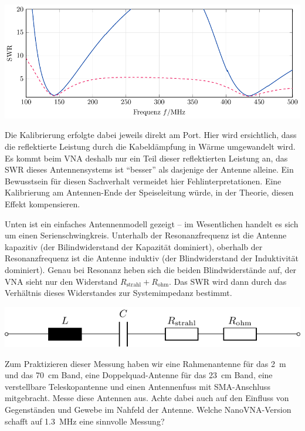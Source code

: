 \documentclass[a4paper,11pt,parskip=half,headings=small,DIV=11,notitlepage,abstract=on]{scrartcl}
\begin{document}
\begin{center}\includegraphics{../skript/figures/feednofeed/feednofeed.pdf}\end{center}  

Die Kalibrierung erfolgte dabei jeweils direkt am Port. Hier wird ersichtlich,
dass die reflektierte Leistung durch die Kabeldämpfung in Wärme umgewandelt
wird. Es kommt beim VNA deshalb nur ein Teil dieser reflektierten Leistung an,
das SWR dieses Antennensystems ist ``besser'' als dasjenige der Antenne alleine.
Ein Bewusstsein für diesen Sachverhalt vermeidet hier Fehlinterpretationen. Eine
Kalibrierung am Antennen-Ende der Speiseleitung würde, in der Theorie, diesen
Effekt kompensieren.

Unten ist ein einfaches Antennenmodell gezeigt -- im Wesentlichen handelt es
sich um einen Serienschwingkreis. Unterhalb der Resonanzfrequenz ist die Antenne
kapazitiv (der Bilindwiderstand der Kapazität dominiert), oberhalb der Resonanzfrequenz
ist die Antenne induktiv (der Blindwiderstand der Induktivität dominiert). Genau
bei Resonanz heben sich die beiden Blindwiderstände auf, der VNA sieht nur den
Widerstand $R_\text{strahl}+R_\text{ohm}$. Das SWR wird dann durch das Verhältnis
dieses Widerstandes zur Systemimpedanz bestimmt.

  \begin{center}
      \includegraphics{../skript/figures/antenna_model/antenna_model.pdf}
  \end{center}

Zum Praktizieren dieser Messung haben wir eine Rahmenantenne für das 2~m und das
70~cm Band, eine Doppelquad-Antenne für das 23~cm Band, eine verstellbare
Teleskopantenne und einen Antennenfuss mit SMA-Anschluss mitgebracht. Messe
diese Antennen aus. Achte dabei auch auf den Einfluss von Gegenständen und
Gewebe im Nahfeld der Antenne. Welche NanoVNA-Version schafft auf 1.3~MHz eine
sinnvolle Messung?
\end{document}

